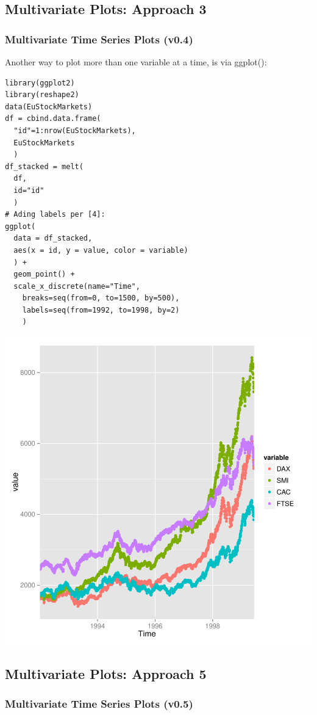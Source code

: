 \subsection{Multivariate Plots: Approach 3}
\begin{frame}
 \frametitle{Multivariate Time Series Plots (v0.4)}

Another way to plot more than one variable at a time, is via \ttfamily ggplot()\normalfont :
		\begin{lstlisting}
library(ggplot2)
library(reshape2)   
data(EuStockMarkets)
df = cbind.data.frame(
  "id"=1:nrow(EuStockMarkets),
  EuStockMarkets
  )
df_stacked = melt(
  df,
  id="id"
  )
# Ading labels per [4]:
ggplot(
  data = df_stacked,
  aes(x = id, y = value, color = variable)
  ) +
  geom_point() +
  scale_x_discrete(name="Time",
    breaks=seq(from=0, to=1500, by=500),
    labels=seq(from=1992, to=1998, by=2)
    )
		\end{lstlisting}

       \begin{center}
         \includegraphics[scale=0.4]{images/stockPlot2.pdf}
        \end{center}
\end{frame}

\subsection{Multivariate Plots: Approach 5}
\begin{frame}
 \frametitle{Multivariate Time Series Plots (v0.5)}


\end{frame}

